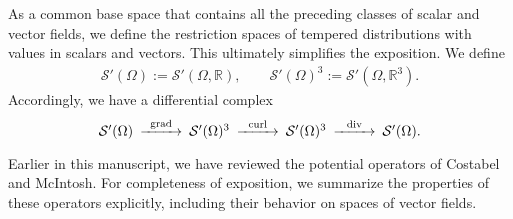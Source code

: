 \documentclass[10pt,a4paper]{amsart}
\theoremstyle{definition}
\theoremstyle{remark}
\numberwithin{equation}{section}
\newcommand{\bbR}{{\mathbb R}}
\newcommand{\calS}{{\mathcal S}}
\newcommand{\Domain}{{\Omega}}
\newcommand{\grad}{\operatorname{grad}}
\newcommand{\curl}{\operatorname{curl}}
\newcommand{\divergence}{\operatorname{div}}
\begin{document}
As a common base space that contains all the preceding classes of scalar and vector fields, we define the restriction spaces of tempered distributions with values in scalars and vectors. This ultimately simplifies the exposition. We define 
\begin{align*}
    \calS'(\Domain) := \calS'(\Domain,\bbR),
    \qquad 
    \calS'(\Domain)^{3} := \calS'(\Domain,\bbR^{3})
    .
\end{align*}
Accordingly, we have a differential complex
\begin{align*}
    \begin{CD}
        \calS'(\Domain) @> \grad >> \calS'(\Domain)^{3} @> \curl >> \calS'(\Domain)^{3} @> \divergence >> \calS'(\Domain)
        .
    \end{CD}
\end{align*}


Earlier in this manuscript, we have reviewed the potential operators of Costabel and McIntosh. 
For completeness of exposition, we summarize the properties of these operators explicitly, including their behavior on spaces of vector fields.
\end{document}
